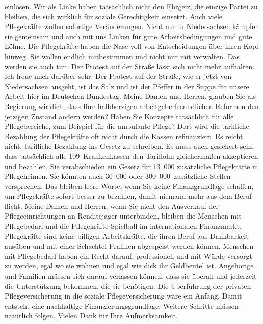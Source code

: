 \documentclass{article}
\begin{document}
einlösen. Wir als Linke haben tatsächlich nicht den Ehrgeiz, die einzige Partei zu bleiben, die sich wirklich für soziale Gerechtigkeit einsetzt.  Auch viele Pflegekräfte wollen sofortige Veränderungen. Nicht nur in Niedersachsen kämpfen sie gemeinsam und auch mit uns Linken für gute Arbeitsbedingungen und gute Löhne. Die Pflegekräfte haben die Nase voll von Entscheidungen über ihren Kopf hinweg. Sie wollen endlich mitbestimmen und nicht nur mit verwalten.  Das werden sie auch tun. Der Protest auf der Straße lässt sich nicht mehr aufhalten. Ich freue mich darüber sehr. Der Protest auf der Straße, wie er jetzt von Niedersachsen ausgeht, ist das Salz und ist der Pfeffer in der Suppe für unsere Arbeit hier im Deutschen Bundestag.  Meine Damen und Herren, glauben Sie als Regierung wirklich, dass Ihre halbherzigen arbeitgeberfreundlichen Reformen den jetzigen Zustand ändern werden? Haben Sie Konzepte tatsächlich für alle Pflegebereiche, zum Beispiel für die ambulante Pflege? Dort wird die tarifliche Bezahlung der Pflegekräfte oft nicht durch die Kassen refinanziert. Es reicht nicht, tarifliche Bezahlung ins Gesetz zu schreiben. Es muss auch gesichert sein, dass tatsächlich alle 109 Krankenkassen den Tariflohn gleichermaßen akzeptieren und bezahlen.  Sie verabschieden ein Gesetz für 13 000 zusätzliche Pflegekräfte in Pflegeheimen. Sie könnten auch 30 000 oder 300 000 zusätzliche Stellen versprechen. Das bleiben leere Worte, wenn Sie keine Finanzgrundlage schaffen, um Pflegekräfte sofort besser zu bezahlen, damit niemand mehr aus dem Beruf flieht. Meine Damen und Herren, wenn Sie nicht den Ausverkauf der Pflegeeinrichtungen an Renditejäger unterbinden, bleiben die Menschen mit Pflegebedarf und die Pflegekräfte Spielball im internationalen Finanzmarkt. Pflegekräfte sind keine billigen Arbeitskräfte, die ihren Beruf aus Dankbarkeit ausüben und mit einer Schachtel Pralinen abgespeist werden können. Menschen mit Pflegebedarf haben ein Recht darauf, professionell und mit Würde versorgt zu werden, egal wo sie wohnen und egal wie dick ihr Geldbeutel ist. Angehörige und Familien müssen sich darauf verlassen können, dass sie überall und jederzeit die Unterstützung bekommen, die sie benötigen.  Die Überführung der privaten Pflegeversicherung in die soziale Pflegeversicherung wäre ein Anfang. Damit entsteht eine nachhaltige Finanzierungsgrundlage. Weitere Schritte müssen natürlich folgen. Vielen Dank für Ihre Aufmerksamkeit.  
\end{document}
